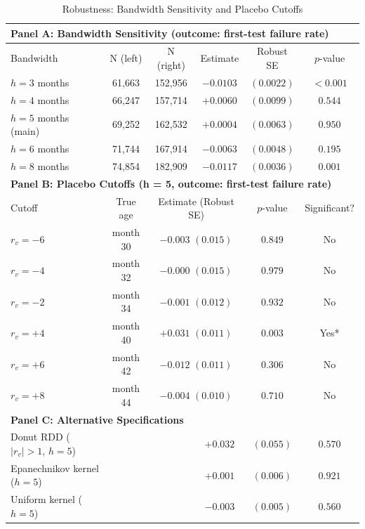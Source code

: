 \begin{table}[htbp]
\centering
\caption{Robustness: Bandwidth Sensitivity and Placebo Cutoffs}\label{tab:robustness}
\begin{threeparttable}
\small
\begin{tabular}{lccccc}
\toprule
\multicolumn{6}{l}{\textbf{Panel A: Bandwidth Sensitivity (outcome: first-test failure rate)}} \\
\midrule
Bandwidth & N (left) & N (right) & Estimate & Robust SE & $p$-value \\
\midrule
$h = 3$ months & 61,663 & 152,956 & $-0.0103$ & $(0.0022)$ & $<0.001$\sym{***} \\
$h = 4$ months & 66,247 & 157,714 & $+0.0060$ & $(0.0099)$ & $0.544$ \\
$h = 5$ months (main) & 69,252 & 162,532 & $+0.0004$ & $(0.0063)$ & $0.950$ \\
$h = 6$ months & 71,744 & 167,914 & $-0.0063$ & $(0.0048)$ & $0.195$ \\
$h = 8$ months & 74,854 & 182,909 & $-0.0117$ & $(0.0036)$ & $0.001$\sym{***} \\
\midrule
\multicolumn{6}{l}{\textbf{Panel B: Placebo Cutoffs (h = 5, outcome: first-test failure rate)}} \\
\midrule
Cutoff & True age & \multicolumn{2}{c}{Estimate (Robust SE)} & $p$-value & Significant? \\
\midrule
$r_v = -6$ & month 30 & \multicolumn{2}{c}{$-0.003$ $(0.015)$} & $0.849$ & No \\
$r_v = -4$ & month 32 & \multicolumn{2}{c}{$-0.000$ $(0.015)$} & $0.979$ & No \\
$r_v = -2$ & month 34 & \multicolumn{2}{c}{$-0.001$ $(0.012)$} & $0.932$ & No \\
$r_v = +4$ & month 40 & \multicolumn{2}{c}{$+0.031$ $(0.011)$} & $0.003$\sym{***} & Yes* \\
$r_v = +6$ & month 42 & \multicolumn{2}{c}{$-0.012$ $(0.011)$} & $0.306$ & No \\
$r_v = +8$ & month 44 & \multicolumn{2}{c}{$-0.004$ $(0.010)$} & $0.710$ & No \\
\midrule
\multicolumn{6}{l}{\textbf{Panel C: Alternative Specifications}} \\
\midrule
Donut RDD ($|r_v| > 1$, $h = 5$) & & & $+0.032$ & $(0.055)$ & $0.570$ \\
Epanechnikov kernel ($h = 5$) & & & $+0.001$ & $(0.006)$ & $0.921$ \\
Uniform kernel ($h = 5$) & & & $-0.003$ & $(0.005)$ & $0.560$ \\

\end{tabular}
\end{threeparttable}
\end{table}
